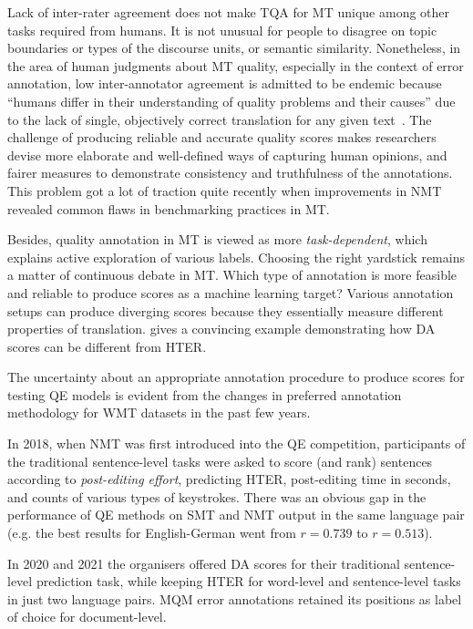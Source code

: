 Lack of inter-rater agreement does not make TQA for MT unique among other tasks required from humans. It is not unusual for people to disagree on topic boundaries or types of the discourse units, or semantic similarity. Nonetheless, in the area of human judgments about MT quality, especially in the context of error annotation, low inter-annotator agreement is admitted to be endemic because ``humans differ in their understanding of quality problems and their causes'' due to the lack of single, objectively correct translation for any given text~\cite{Lommel2014}. The challenge of producing reliable and accurate quality scores makes researchers devise more elaborate and well-defined ways of capturing human opinions, and fairer measures to demonstrate consistency and truthfulness of the annotations. This problem got a lot of traction quite recently when improvements in \gls{NMT} revealed common flaws in benchmarking practices in MT.

Besides, quality annotation in MT is viewed as more \textit{task-dependent}, which explains active exploration of various labels.
Choosing the right yardstick remains a matter of continuous debate in MT. Which type of annotation is more feasible and reliable to produce scores as a machine learning target?
Various annotation setups can produce diverging scores because they essentially measure different properties of translation. 
\citet[p.101]{Yankovskaya2019} gives a convincing example demonstrating how \gls{DA} scores can be different from \gls{HTER}. 

The uncertainty about an appropriate annotation procedure to produce scores for testing QE models is evident from the changes in preferred annotation methodology for \gls{WMT} datasets in the past few years. 

In 2018, when NMT was first introduced into the QE competition, participants of the traditional sentence-level tasks were asked to score (and rank) sentences according to \textit{post-editing effort}, predicting \gls{HTER}, post-editing time in seconds, and counts of various types of keystrokes. There was an obvious gap in the performance of QE methods on \gls{SMT} and NMT output in the same language pair (e.g. the best results for English-German went from $r=0.739$ to $r=0.513$). 


In 2020 and 2021 the organisers offered \gls{DA} scores for their traditional sentence-level prediction task, while keeping HTER for word-level and sentence-level tasks in just two language pairs. \gls{MQM} error annotations retained its positions as label of choice for document-level.

